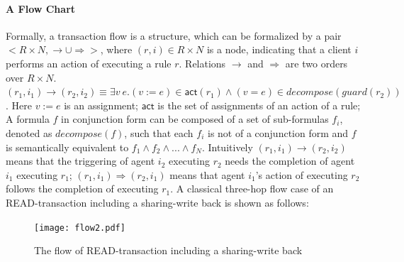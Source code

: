 \documentclass{llncs}
\begin{document}
\paragraph*{A Flow Chart} Formally, a transaction flow is a structure, which can be formalized by a pair $<R \times N, \rightarrow \cup \Rightarrow>$, where $(r,i) \in R \times N$ is a  node, indicating that a client $i$ performs an action of executing a rule $r$. Relations  $\rightarrow$  and $\Rightarrow$ are two   orders over $R \times N$. $(r_1,i_1) \rightarrow (r_2,i_2) \equiv \exists v~e. (v:=e) \in \mathsf{act}(r_1) \land (v=e) \in decompose(guard(r_2))$. Here $v:=e$ is an assignment; $\mathsf{act}$ is the set of assignments of an action of a rule; A formula $f$ in conjunction form can be composed of a set of sub-formulas $f_i$, denoted as $decompose(f)$, such that each $f_i$  is not of a conjunction form and $f$ is semantically equivalent to $f_1 \land f_2 \land ... \land f_N$. Intuitively $(r_1,i_1) \rightarrow (r_2,i_2)$ means that the triggering of agent $i_2$ executing $r_2$ needs the completion of agent $i_1$ executing $r_1$; $(r_1,i_1) \Rightarrow (r_2,i_1)$ means that agent $i_1$'s action of executing $r_2$ follows the completion of  executing $r_1$. A classical three-hop flow case of an READ-transaction including a sharing-write back is shown as follows:

\vspace{-20pt}
\begin{figure}[htbp]
\centering
\texttt{[image: flow2.pdf]}
\vspace{-20pt}
\caption{The flow of READ-transaction including a sharing-write back\label{fig:arch}}
\end{figure}
\vspace{-15pt}
\end{document}
